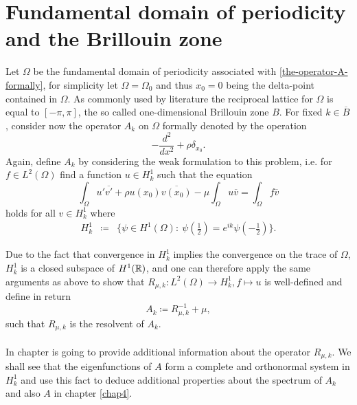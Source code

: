 \chapter{Fundamental domain of periodicity and the Brillouin zone}

Let $\Omega$ be the fundamental domain of periodicity associated with \eqref{the-operator-A-formally}, for simplicity let $\Omega = \Omega_{0}$ and thus $x_{0} = 0$ being the delta-point contained in $\Omega$. As commonly used by literature the reciprocal lattice for $\Omega$ is equal to $[-\pi, \pi]$, the so called one-dimensional Brillouin zone $B$. For fixed $k \in \overline{B}$, consider now the operator $A_{k}$ on $\Omega$ formally denoted by the operation
	\[ -\frac{d^{2}}{dx^{2}} + \rho \delta_{x_{0}}. \]
Again, define $A_{k}$ by considering the weak formulation to this problem, i.e. for $f \in L^{2}(\Omega)$ find a function $u \in H^{1}_{k}$ such that the equation
	\[ \int_{\Omega} u' \overline{v'} + \rho u(x_{0}) \overline{v(x_{0})} - \mu \int_{\Omega} u \overline{v} = \int_{\Omega} f \overline{v} \]
holds for all $v \in H^{1}_{k}$ where 
	\begin{eqnarray}
		H^{1}_{k} & \coloneqq & \Big\{ \psi \in H^{1}(\Omega): ~ \psi(\frac{1}{2}) = e^{ik} \psi(-\frac{1}{2}) \Big\}. \label{quasi-periodic-condition}
	\end{eqnarray}

Due to the fact that convergence in $H^{1}_{k}$ implies the convergence on the trace of $\Omega$, $H^{1}_{k}$ is a closed subspace of $H^{1}(\mathbb{R})$, and one can therefore apply the same arguments as above to show that $R_{\mu, k} \colon L^{2}(\Omega) \rightarrow H^{1}_{k}, f \mapsto u$ is well-defined and define in return %
	\[ A_{k} \coloneqq R_{\mu, k}^{-1} + \mu, \] 
such that $R_{\mu, k}$ is the resolvent of $A_{k}$.	
~\\ ~\\
In chapter is going to provide additional information about the operator $R_{\mu, k}$. We shall see that the eigenfunctions of $A$ form a complete and orthonormal system in $H^{1}_{k}$ and use this fact to deduce additional properties about the spectrum of $A_{k}$ and also $A$ in chapter \ref{chap4}.

